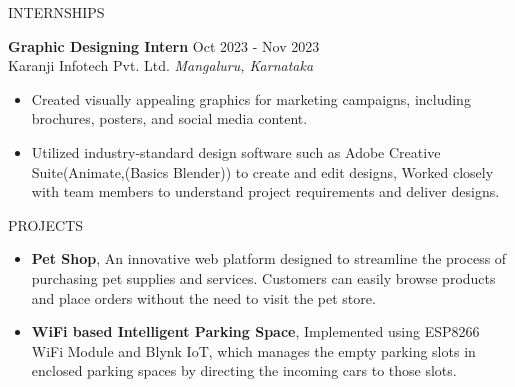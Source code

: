 \documentclass{resume} %
\begin{document}
\begin{rSection}{INTERNSHIPS}

\textbf{Graphic Designing Intern} \hfill Oct 2023 - Nov 2023\\
Karanji Infotech Pvt. Ltd. \hfill \textit{Mangaluru, Karnataka}
 \begin{itemize}
    \itemsep -3pt {} 
     \item Created visually appealing graphics for marketing campaigns, including brochures, posters, and social media content.
    \item Utilized industry-standard design software such as Adobe Creative Suite(Animate,(Basics Blender)) to create and edit designs, Worked closely with team members to understand project requirements and deliver designs. 
 \end{itemize}
 


\end{rSection} 


\begin{rSection}{PROJECTS}
\begin{itemize}
\item \textbf{Pet Shop}{, An innovative web platform designed to streamline the process of purchasing pet supplies and services. Customers can easily browse products and place orders without the need to visit the pet store.}
\item \textbf{WiFi based Intelligent Parking Space}{, Implemented using ESP8266 WiFi Module and Blynk IoT, which manages the empty parking slots in enclosed parking spaces by directing the incoming cars to those slots.}
\end{itemize}

\end{rSection} 
\end{document}
